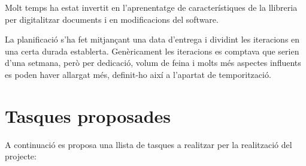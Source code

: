 \documentclass[letterpaper,11pt,catalan]{sphinxmanual}
\begin{document}
Molt temps ha estat invertit en l'aprenentatge de característiques de la llibreria per
digitalitzar documents i en modificacions del software.

La planificació s'ha fet mitjançant una data d'entrega i dividint les iteracions en
una certa durada establerta. Genèricament les iteracions es comptava que serien d'una
setmana, però per dedicació, volum de feina i molts més aspectes influents es poden
haver allargat més, definit-ho així a l'apartat de temporització.


\section{Tasques proposades}
\label{\detokenize{index:tasques-proposades}}
A continuació es proposa una llista de tasques a realitzar per la realització del projecte:
\end{document}

